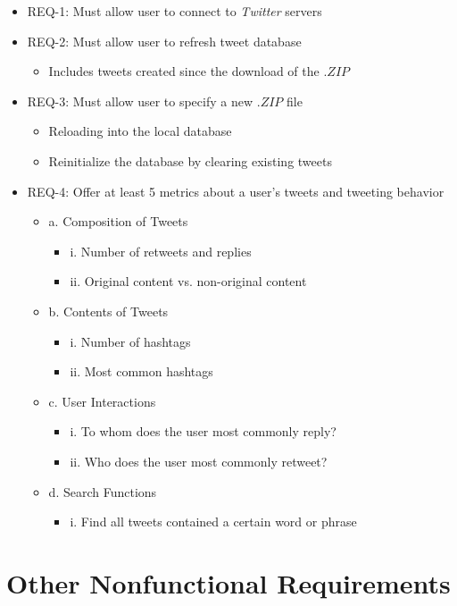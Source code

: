 \documentclass[a4paper, 12pt]{article}
\begin{document}
\begin{itemize}
\item REQ-1: Must allow user to connect to \textit{Twitter} servers
\item REQ-2: Must allow user to refresh tweet database
\begin{itemize}
\item Includes tweets created since the download of the $.ZIP$
\end{itemize}
\item REQ-3: Must allow user to specify a new $.ZIP$ file
\begin{itemize}
\item Reloading into the local database
\item Reinitialize the database by clearing existing tweets
\end{itemize}
\item REQ-4: Offer at least 5 metrics about a user’s tweets and tweeting behavior
\begin {itemize} 
\item a. Composition of Tweets
\begin{itemize}
\item i. Number of retweets and replies
\item ii. Original content vs. non-original content
\end{itemize}
\item b. Contents of Tweets
\begin{itemize}
\item i. Number of hashtags
\item ii. Most common hashtags
\end{itemize}
\item c. User Interactions
\begin{itemize}
\item i. To whom does the user most commonly reply?
\item ii. Who does the user most commonly retweet?
\end{itemize}
\item d. Search Functions
\begin{itemize}
\item i. Find all tweets contained a certain word or phrase
\end{itemize}
\end{itemize}
\end{itemize}

\section{Other Nonfunctional Requirements} \label{sec:othernonfunc}
\end{document}
